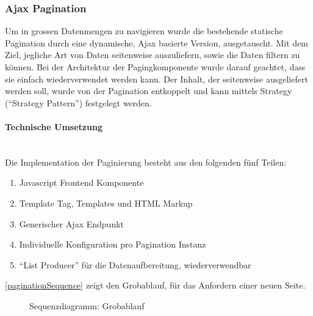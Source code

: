 \subsubsection{Ajax Pagination} Um in grossen Datenmengen zu navigieren wurde
die bestehende statische Pagination durch eine dynamische, Ajax basierte
Version, ausgetauscht. Mit dem Ziel, jegliche Art von Daten seitenweise auszuliefern, sowie die Daten filtern zu können. 
Bei der Architektur der Pagingkomponente wurde darauf geachtet, dass sie einfach wiederverwendet werden kann. Der Inhalt, der seitenweise ausgeliefert werden soll, wurde von der Pagination entkoppelt und kann mittels Strategy (\enquote{Strategy Pattern}\cite{gamma1994design}) festgelegt werden.

\paragraph{Technische Umsetzung} \hspace{0pt} \\
Die Implementation der Paginierung besteht aus den folgenden fünf Teilen:
\begin{enumerate}
	\item Javascript Frontend Komponente
	\item Template Tag, Templates und HTML Markup
	\item Generischer Ajax Endpunkt
	\item Individuelle Konfiguration pro Pagination Instanz
	\item \enquote{List Producer} für die Datenaufbereitung, wiederverwendbar
\end{enumerate}

\autoref{paginationSequence} zeigt den Grobablauf, für das Anfordern einer
neuen Seite.

\begin{figure}[H]	
	\centering
	
	\caption{Sequenzdiagramm: Grobablauf}
	\label{paginationSequence}
\end{figure}



